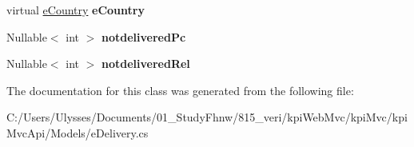 \begin{DoxyCompactItemize}
virtual \hyperlink{classkpi_mvc_api_1_1_models_1_1e_country}{e\+Country} {\bfseries e\+Country}
\item 
\mbox{\label{classkpi_mvc_api_1_1_models_1_1e_delivery_a926ff2a872a98cccfd72dab827a9b273}} 
Nullable$<$ int $>$ {\bfseries notdelivered\+Pc}
\item 
\mbox{\label{classkpi_mvc_api_1_1_models_1_1e_delivery_a008a94aecbb8b3262033f8f1baaf3783}} 
Nullable$<$ int $>$ {\bfseries notdelivered\+Rel}
\end{DoxyCompactItemize}


The documentation for this class was generated from the following file\+:\begin{DoxyCompactItemize}
\item 
C\+:/\+Users/\+Ulysses/\+Documents/01\+\_\+\+Study\+Fhnw/815\+\_\+veri/kpi\+Web\+Mvc/kpi\+Mvc/kpi\+Mvc\+Api/\+Models/e\+Delivery.\+cs\end{DoxyCompactItemize}
